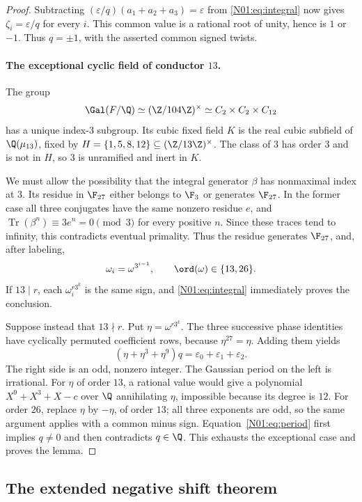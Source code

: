 \documentclass[11pt,a4paper]{article}
\theoremstyle{definition}\newtheorem{definition}[theorem]{Definition}
\theoremstyle{remark}\newtheorem{remark}[theorem]{Remark}
\DeclareMathOperator{\Tr}{Tr}\DeclareMathOperator{\tr}{tr}\DeclareMathOperator{\Nm}{N}
\begin{document}
\begin{proof}
Subtracting $(\varepsilon/q)(a_1+a_2+a_3)=\varepsilon$ from
\eqref{N01:eq:integral} now gives $\zeta_i=\varepsilon/q$ for every $i$.
This common value is a rational root of unity, hence is $1$ or $-1$.
Thus $q=\pm1$, with the asserted common signed twists.

\paragraph{The exceptional cyclic field of conductor $13$.}
The group
\[
 \Gal(F/\Q)\simeq (\Z/104\Z)^\times\simeq C_2\times C_2\times C_{12}
\]
has a unique index-$3$ subgroup. Its cubic fixed field $K$ is the
real cubic subfield of $\Q(\mu_{13})$, fixed by
$H=\{1,5,8,12\}\subseteq(\Z/13\Z)^\times$.
The class of $3$ has order $3$ and is not in $H$, so $3$ is
unramified and inert in $K$.

We must allow the possibility that the integral generator $\beta$
has nonmaximal index at $3$. Its residue in $\F_{27}$ either belongs
to $\F_3$ or generates $\F_{27}$. In the former case all three
conjugates have the same nonzero residue $e$, and
$\Tr(\beta^n)\equiv3e^n=0\pmod3$ for every positive $n$.
Since these traces tend to infinity, this contradicts eventual
primality. Thus the residue generates $\F_{27}$, and, after labeling,
\[
 \omega_i=\omega^{3^{i-1}},\qquad \ord(\omega)\in\{13,26\}.
\]
If $13\mid r$, each $\omega_i^{r3^k}$ is the same sign, and
\eqref{N01:eq:integral} immediately proves the conclusion.

Suppose instead that $13\nmid r$. Put $\eta=\omega^{r3^k}$.
The three successive phase identities have cyclically permuted
coefficient rows, because $\eta^{27}=\eta$. Adding them yields
\begin{equation}\label{N01:eq:period}
 (\eta+\eta^3+\eta^9)q=\varepsilon_0+\varepsilon_1+\varepsilon_2.
\end{equation}
The right side is an odd, nonzero integer. The Gaussian period on
the left is irrational. For $\eta$ of order $13$, a rational value
would give a polynomial $X^9+X^3+X-c$ over $\Q$ annihilating
$\eta$, impossible because its degree is $12$. For order $26$,
replace $\eta$ by $-\eta$, of order $13$; all three exponents are
odd, so the same argument applies with a common minus sign.
Equation~\eqref{N01:eq:period} first implies $q\ne0$ and then contradicts
$q\in\Q$. This exhausts the exceptional case and proves the lemma.
\end{proof}

\subsection{The extended negative shift theorem}
\end{document}

